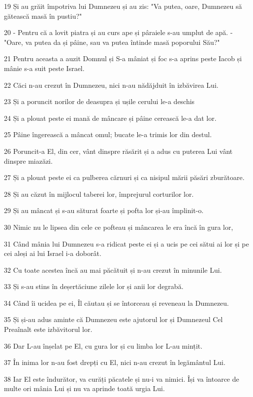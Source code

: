 \par 19 Și au grăit împotriva lui Dumnezeu și au zis: "Va putea, oare, Dumnezeu să gătească masă în pustiu?"
\par 20 - Pentru că a lovit piatra și au curs ape și pâraiele s-au umplut de apă. - "Oare, va putea da și pâine, sau va putea întinde masă poporului Său?"
\par 21 Pentru aceasta a auzit Domnul și S-a mâniat și foc s-a aprins peste Iacob și mânie s-a suit peste Israel.
\par 22 Căci n-au crezut în Dumnezeu, nici n-au nădăjduit în izbăvirea Lui.
\par 23 Și a poruncit norilor de deasupra și ușile cerului le-a deschis
\par 24 Și a plouat peste ei mană de mâncare și pâine cerească le-a dat lor.
\par 25 Pâine îngerească a mâncat omul; bucate le-a trimis lor din destul.
\par 26 Poruncit-a El, din cer, vânt dinspre răsărit și a adus cu puterea Lui vânt dinspre miazăzi.
\par 27 Și a plouat peste ei ca pulberea cărnuri și ca nisipul mării păsări zburătoare.
\par 28 Și au căzut în mijlocul taberei lor, împrejurul corturilor lor.
\par 29 Și au mâncat și s-au săturat foarte și pofta lor și-au împlinit-o.
\par 30 Nimic nu le lipsea din cele ce pofteau și mâncarea le era încă în gura lor,
\par 31 Când mânia lui Dumnezeu s-a ridicat peste ei și a ucis pe cei sătui ai lor și pe cei aleși ai lui Israel i-a doborât.
\par 32 Cu toate acestea încă au mai păcătuit și n-au crezut în minunile Lui.
\par 33 Și s-au stins în deșertăciune zilele lor și anii lor degrabă.
\par 34 Când îi ucidea pe ei, Îl căutau și se întorceau și reveneau la Dumnezeu.
\par 35 Și și-au adus aminte că Dumnezeu este ajutorul lor și Dumnezeul Cel Preaînalt este izbăvitorul lor.
\par 36 Dar L-au înșelat pe El, cu gura lor și cu limba lor L-au mințit.
\par 37 În inima lor n-au fost drepți cu El, nici n-au crezut în legământul Lui.
\par 38 Iar El este îndurător, va curăți păcatele și nu-i va nimici. Își va întoarce de multe ori mânia Lui și nu va aprinde toată urgia Lui.
